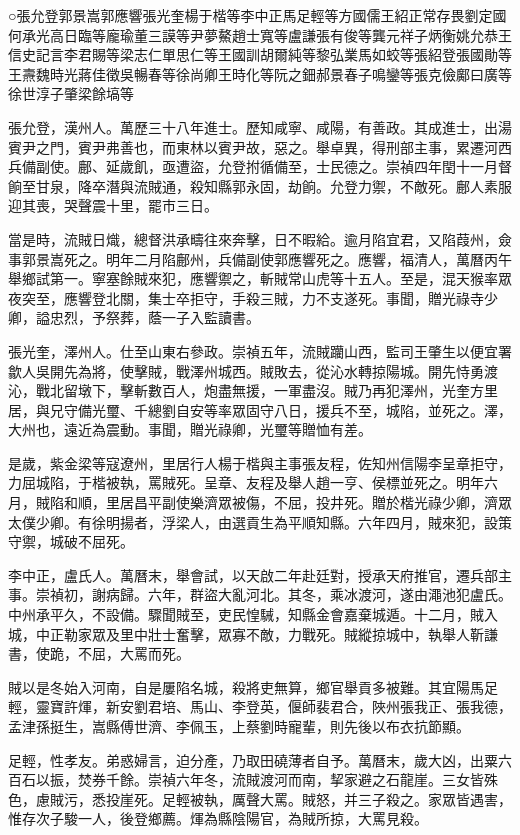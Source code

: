 
\begin{pinyinscope}
○張允登郭景嵩郭應響張光奎楊于楷等李中正馬足輕等方國儒王紹正常存畏劉定國何承光高日臨等龐瑜董三謨等尹夢鰲趙士寬等盧謙張有俊等龔元祥子炳衡姚允恭王信史記言李君賜等梁志仁單思仁等王國訓胡爾純等黎弘業馬如蛟等張紹登張國勛等王燾魏時光蔣佳徵吳暢春等徐尚卿王時化等阮之鈿郝景春子鳴鑾等張克儉鄺曰廣等徐世淳子肇梁餘塙等

張允登，漢州人。萬歷三十八年進士。歷知咸寧、咸陽，有善政。其成進士，出湯賓尹之門，賓尹弗善也，而東林以賓尹故，惡之。舉卓異，得刑部主事，累遷河西兵備副使。鄜、延歲飢，亟遭盜，允登拊循備至，士民德之。崇禎四年閏十一月督餉至甘泉，降卒潛與流賊通，殺知縣郭永固，劫餉。允登力禦，不敵死。鄜人素服迎其喪，哭聲震十里，罷市三日。

當是時，流賊日熾，總督洪承疇往來奔擊，日不暇給。逾月陷宜君，又陷葭州，僉事郭景嵩死之。明年二月陷鄜州，兵備副使郭應響死之。應響，福清人，萬曆丙午舉鄉試第一。寧塞餘賊來犯，應響禦之，斬賊常山虎等十五人。至是，混天猴率眾夜突至，應響登北關，集士卒拒守，手殺三賊，力不支遂死。事聞，贈光祿寺少卿，謚忠烈，予祭葬，蔭一子入監讀書。

張光奎，澤州人。仕至山東右參政。崇禎五年，流賊躪山西，監司王肇生以便宜署歙人吳開先為將，使擊賊，戰澤州城西。賊敗去，從沁水轉掠陽城。開先恃勇渡沁，戰北留墩下，擊斬數百人，炮盡無援，一軍盡沒。賊乃再犯澤州，光奎方里居，與兄守備光璽、千總劉自安等率眾固守八日，援兵不至，城陷，並死之。澤，大州也，遠近為震動。事聞，贈光祿卿，光璽等贈恤有差。

是歲，紫金梁等寇遼州，里居行人楊于楷與主事張友程，佐知州信陽李呈章拒守，力屈城陷，于楷被執，罵賊死。呈章、友程及舉人趙一亨、侯標並死之。明年六月，賊陷和順，里居昌平副使樂濟眾被傷，不屈，投井死。贈於楷光祿少卿，濟眾太僕少卿。有徐明揚者，浮梁人，由選貢生為平順知縣。六年四月，賊來犯，設策守禦，城破不屈死。

李中正，盧氏人。萬曆末，舉會試，以天啟二年赴廷對，授承天府推官，遷兵部主事。崇禎初，謝病歸。六年，群盜大亂河北。其冬，乘冰渡河，遂由澠池犯盧氏。中州承平久，不設備。驟聞賊至，吏民惶駴，知縣金會嘉棄城遁。十二月，賊入城，中正勒家眾及里中壯士奮擊，眾寡不敵，力戰死。賊縱掠城中，執舉人靳謙書，使跪，不屈，大罵而死。

賊以是冬始入河南，自是屢陷名城，殺將吏無算，鄉官舉貢多被難。其宜陽馬足輕，靈寶許煇，新安劉君培、馬山、李登英，偃師裴君合，陜州張我正、張我德，孟津孫挺生，嵩縣傅世濟、李佩玉，上蔡劉時寵輩，則先後以布衣抗節顯。

足輕，性孝友。弟惑婦言，迫分產，乃取田磽薄者自予。萬曆末，歲大凶，出粟六百石以振，焚券千餘。崇禎六年冬，流賊渡河而南，挈家避之石龍崖。三女皆殊色，慮賊污，悉投崖死。足輕被執，厲聲大罵。賊怒，并三子殺之。家眾皆遇害，惟存次子駿一人，後登鄉薦。煇為縣陰陽官，為賊所掠，大罵見殺。


\end{pinyinscope}
